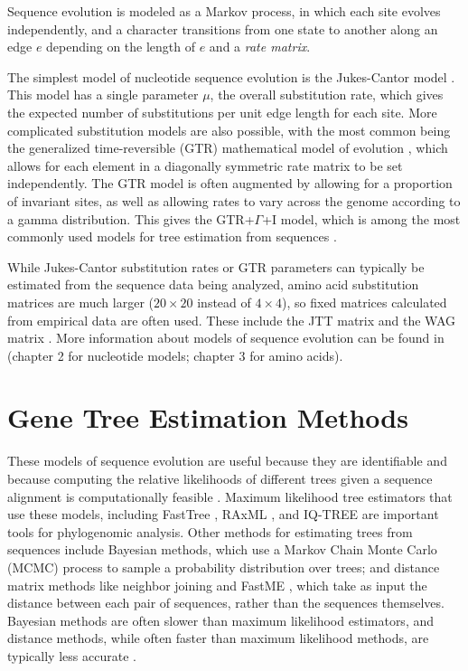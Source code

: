 \documentclass[tocnosub,noragright,centerchapter,fullpagesingle,12pt]{uiuc_csthesis18}
\begin{document}
Sequence evolution is modeled as a Markov process, in which each site evolves independently, and a
character transitions from one state to another along an edge $e$
depending on the length of $e$ and a \emph{rate matrix}.

The simplest model of nucleotide sequence evolution is the Jukes-Cantor model \cite{jukes1969evolution}. This model has a single parameter $\mu$, the overall substitution rate, which gives the expected number of substitutions per unit edge length for each site. More complicated substitution models are also possible, with the most common being the generalized time-reversible (GTR) mathematical model of evolution \cite{tavare-gtr}, which allows for each element in a diagonally symmetric rate matrix to be set independently. The GTR model is often augmented by allowing for a proportion of invariant sites, as well as allowing rates to vary across the genome according to a gamma distribution. This gives the GTR+$\Gamma$+I model, which is among the most commonly used models for tree estimation from sequences \cite{gu1995maximum,allman2008identifiability,chai2011rogers}.

While Jukes-Cantor substitution rates or GTR parameters can typically be estimated from the sequence data being analyzed, amino acid substitution matrices are much larger ($20\times 20$ instead of $4 \times 4$), so fixed matrices calculated from empirical data are often used. These include the JTT matrix \cite{jones1992rapid} and the WAG matrix \cite{whelan2001general}. 
More information about models of sequence evolution can be found in \cite{yang2014molecular} (chapter 2 for nucleotide models; chapter 3 for amino acids).


\section{Gene Tree Estimation Methods}

These models of sequence evolution are useful because they are identifiable \cite{chai2011rogers} and because computing the relative likelihoods of
different trees given a sequence alignment is computationally feasible \cite{felsenstein1981evolutionary}. Maximum likelihood tree estimators that use these models, including FastTree \cite{price2010fasttree}, RAxML \cite{stamatakis2014raxml}, and IQ-TREE \cite{nguyen2014iq} are important tools for phylogenomic analysis. Other methods for estimating trees from sequences include Bayesian methods, which use a Markov Chain Monte Carlo (MCMC) process to sample a probability distribution over trees; and distance matrix methods like neighbor joining \cite{saitou1987neighbor} and FastME \cite{lefort2015fastme}, which take as input the distance between each pair of sequences, rather than the sequences themselves. Bayesian methods are often slower than maximum likelihood estimators, and distance methods, while often faster than maximum likelihood methods, are typically less accurate \cite{Wang-MSA2011}.
\end{document}
